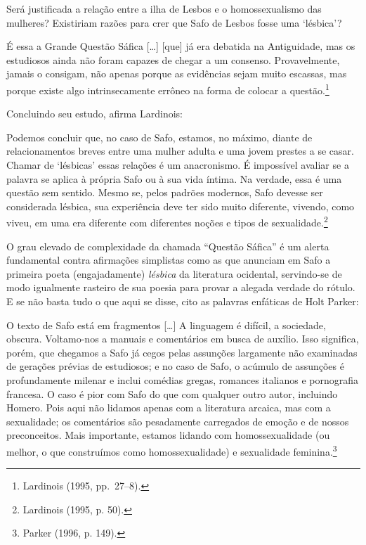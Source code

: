 \begin{hedraquote}
Será justificada a relação entre a ilha de Lesbos e o homossexualismo das
mulheres? Existiriam razões para crer que Safo de Lesbos fosse uma ‘lésbica’?

É essa a Grande Questão Sáfica [\ldots{}] [que] já era debatida na Antiguidade, mas
os estudiosos ainda não foram capazes de chegar a um consenso. Provavelmente,
jamais o consigam, não apenas porque as evidências sejam muito escassas, mas
porque existe algo intrinsecamente errôneo na forma de colocar a questão.\footnote{ Lardinois (1995, pp.~27--8).}
\end{hedraquote}

Concluindo seu estudo, afirma Lardinois:

\begin{hedraquote}
Podemos concluir que, no caso de Safo, estamos, no máximo, diante de
relacionamentos breves entre uma mulher adulta e uma jovem prestes a se casar.
Chamar de ‘lésbicas’ essas relações é um anacronismo. É impossível avaliar se a
palavra se aplica à própria Safo ou à sua vida íntima. Na verdade, essa é uma
questão sem sentido. Mesmo se, pelos padrões modernos, Safo devesse ser
considerada lésbica, sua experiência deve ter sido muito diferente, vivendo,
como viveu, em uma era diferente com diferentes noções e tipos de sexualidade.\footnote{ Lardinois (1995, p. 50).}
\end{hedraquote}

O grau elevado de complexidade da chamada “Questão Sáfica” é um alerta
fundamental contra afirmações simplistas como as que anunciam em Safo a
primeira poeta (engajadamente) \textit{lésbica} da literatura ocidental,
servindo-se de modo igualmente rasteiro de sua poesia para provar a alegada
verdade do rótulo. E se não basta tudo o que aqui se disse, cito as palavras
enfáticas de Holt Parker: 

\begin{hedraquote}
O texto de Safo está em fragmentos [\ldots{}] A linguagem é difícil, a sociedade,
obscura. Voltamo-nos a manuais e comentários em busca de auxílio. Isso
significa, porém, que chegamos a Safo já cegos pelas assunções largamente não
examinadas de gerações prévias de estudiosos; e no caso de Safo, o acúmulo de
assunções é profundamente milenar e inclui comédias gregas, romances italianos
e pornografia francesa. O caso é pior com Safo do que com qualquer outro autor,
incluindo Homero. Pois aqui não lidamos apenas com a literatura arcaica, mas
com a sexualidade; os comentários são pesadamente carregados de emoção e de
nossos preconceitos. Mais importante, estamos lidando com homossexualidade (ou
melhor, o que construímos como homossexualidade) e sexualidade feminina.\footnote{ Parker (1996, p. 149).}
\end{hedraquote}

